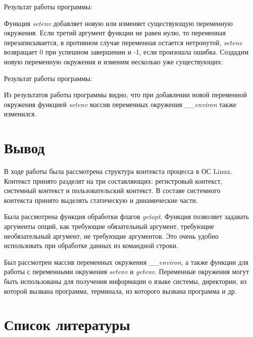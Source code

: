 \documentclass[14pt,a4paper,report]{report}
\begin{document}
Результат работы программы:



Функция \emph{setenv} добавляет новую или изменяет существующую переменную окружения. Если третий аргумент функции не равен нулю, то переменная перезаписывается, в противном случае переменная остается нетронутой, \emph{setenv} возвращает 0 при успешном завершении и -1, если произошла ошибка. Создадим новую переменную окружения и изменим несколько уже существующих:



Результат работы программы:



Из результатов работы программы видно, что при добавлении новой переменной окружения функцией \emph{setenv} массив переменных окружения \emph{\_\_environ} также изменился.

\section{Вывод}

В ходе работы была рассмотрена структура контекста процесса в ОС Linux. Контекст принято разделят на три составляющих: регистровый контекст, системный контекст и пользовательский контекст. В составе системного контекста принято выделять статическую и динамические части.

Была рассмотрена функция обработки флагов \emph{getopt}. Функция позволяет задавать аргументы опций, как требующие обязательный аргумент, требующие необязательный аргумент, не требующие аргументов. Это очень удобно использовать при обработке данных из командной строки.

Был рассмотрен массив переменных окружения \emph{\_\_environ}, а также функции для работы с переменными окружения \emph{setenv} и \emph{getenv}. Переменные окружения могут быть использованы для получения информации о языке системы, директории, из которой вызвана программа, терминала, из которого вызвана программа и др.

\section{Список литературы}
\end{document}
